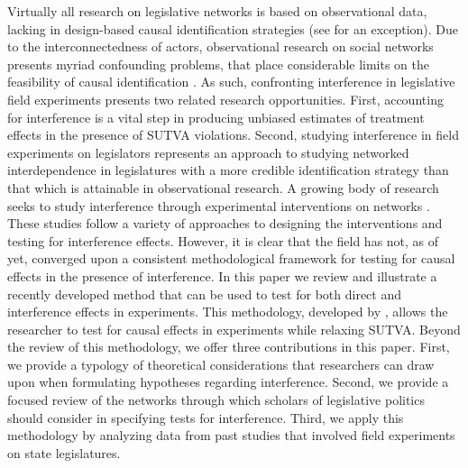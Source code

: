 \documentclass[12pt]{article}
\begin{document}
Virtually all research on legislative networks is based on observational data, lacking in design-based causal identification strategies (see \citet{rogowski2012estimating} for an exception). Due to the interconnectedness of actors, observational research on social networks presents myriad confounding problems, that place considerable limits on the feasibility of causal identification \citep{Shalizi:2011}. As such, confronting interference in legislative field experiments presents two related research opportunities. First, accounting for interference is a vital step in producing unbiased estimates of treatment effects in the presence of SUTVA violations. Second, studying interference in field experiments on legislators represents an approach to studying networked interdependence in legislatures with a more credible identification strategy than that which is attainable in observational research. A growing body of research seeks to study interference through experimental interventions on networks \citep[e.g., ][]{gerber2008,paluck2011,Bond:2012,muchnik2013,aral2014,bapna2015,Ben-AaronPAR}. These studies follow a variety of approaches to designing the interventions and testing for interference effects. However, it is clear that the field has not, as of yet, converged upon a consistent methodological framework for testing for causal effects in the presence of interference. In this paper we review and illustrate a recently developed method that can be used to test for both direct and interference effects in experiments. This methodology, developed by \citet{bowers2012reasoning}, allows the researcher to test for causal effects in experiments while relaxing SUTVA. Beyond the review of this methodology, we offer three contributions in this paper. First, we provide a typology of theoretical considerations that researchers can draw upon when formulating hypotheses regarding interference. Second, we provide a focused review of the networks through which scholars of legislative politics should consider in specifying tests for interference. Third, we apply this methodology by analyzing data from past studies that involved field experiments on state legislatures. 



\end{document}
